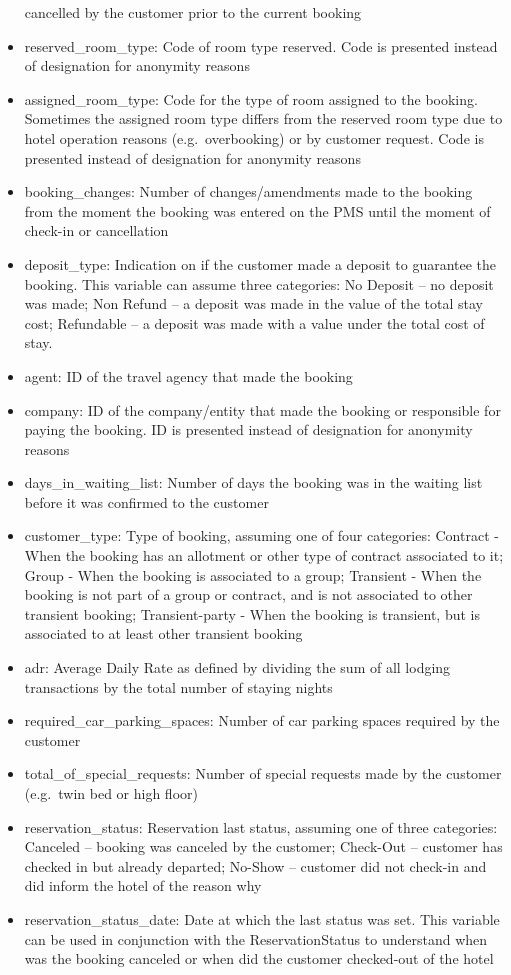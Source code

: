 \documentclass[11pt]{article}
\begin{document}
\begin{itemize}
  cancelled by the customer prior to the current booking
\item
  reserved\_room\_type: Code of room type reserved. Code is presented
  instead of designation for anonymity reasons
\item
  assigned\_room\_type: Code for the type of room assigned to the
  booking. Sometimes the assigned room type differs from the reserved
  room type due to hotel operation reasons (e.g.~overbooking) or by
  customer request. Code is presented instead of designation for
  anonymity reasons
\item
  booking\_changes: Number of changes/amendments made to the booking
  from the moment the booking was entered on the PMS until the moment of
  check-in or cancellation
\item
  deposit\_type: Indication on if the customer made a deposit to
  guarantee the booking. This variable can assume three categories: No
  Deposit -- no deposit was made; Non Refund -- a deposit was made in
  the value of the total stay cost; Refundable -- a deposit was made
  with a value under the total cost of stay.
\item
  agent: ID of the travel agency that made the booking
\item
  company: ID of the company/entity that made the booking or responsible
  for paying the booking. ID is presented instead of designation for
  anonymity reasons
\item
  days\_in\_waiting\_list: Number of days the booking was in the waiting
  list before it was confirmed to the customer
\item
  customer\_type: Type of booking, assuming one of four categories:
  Contract - When the booking has an allotment or other type of contract
  associated to it; Group - When the booking is associated to a group;
  Transient - When the booking is not part of a group or contract, and
  is not associated to other transient booking; Transient-party - When
  the booking is transient, but is associated to at least other
  transient booking
\item
  adr: Average Daily Rate as defined by dividing the sum of all lodging
  transactions by the total number of staying nights
\item
  required\_car\_parking\_spaces: Number of car parking spaces required
  by the customer
\item
  total\_of\_special\_requests: Number of special requests made by the
  customer (e.g.~twin bed or high floor)
\item
  reservation\_status: Reservation last status, assuming one of three
  categories: Canceled -- booking was canceled by the customer;
  Check-Out -- customer has checked in but already departed; No-Show --
  customer did not check-in and did inform the hotel of the reason why
\item
  reservation\_status\_date: Date at which the last status was set. This
  variable can be used in conjunction with the ReservationStatus to
  understand when was the booking canceled or when did the customer
  checked-out of the hotel
\end{itemize}
\end{document}
